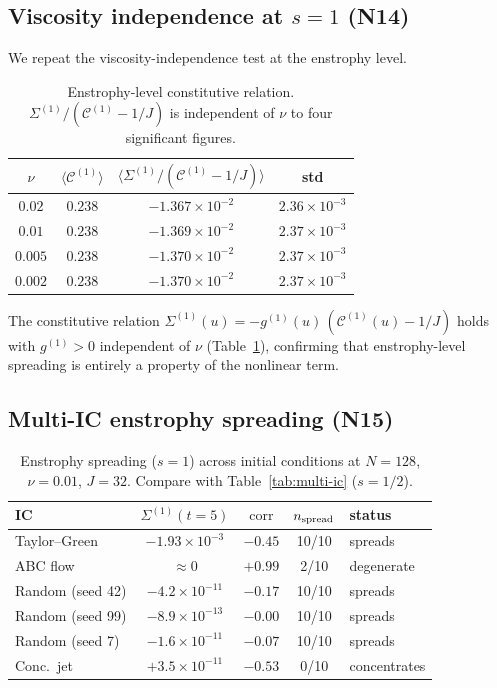 \documentclass[11pt]{article}
\theoremstyle{definition}
\newcommand{\cC}{\mathcal{C}}
\DeclareMathOperator{\corr}{corr}
\begin{document}
\subsection{Viscosity independence at $s=1$ (N14)}
\label{sec:enst-visc}

We repeat the viscosity-independence test at the
enstrophy level.

\begin{table}[h]
\centering
\caption{Enstrophy-level constitutive relation.
$\Sigma^{(1)}/(\cC^{(1)}-1/J)$ is independent of
$\nu$ to four significant figures.}
\label{tab:enst-visc}
\begin{tabular}{@{}cccc@{}}
\toprule
$\nu$ & $\langle\cC^{(1)}\rangle$
  & $\langle\Sigma^{(1)}/(\cC^{(1)}\!-\!1/J)\rangle$
  & std \\
\midrule
$0.02$  & $0.238$ & $-1.367\times 10^{-2}$
  & $2.36\times 10^{-3}$ \\
$0.01$  & $0.238$ & $-1.369\times 10^{-2}$
  & $2.37\times 10^{-3}$ \\
$0.005$ & $0.238$ & $-1.370\times 10^{-2}$
  & $2.37\times 10^{-3}$ \\
$0.002$ & $0.238$ & $-1.370\times 10^{-2}$
  & $2.37\times 10^{-3}$ \\
\bottomrule
\end{tabular}
\end{table}

The constitutive relation
$\Sigma^{(1)}(u) = -g^{(1)}(u)\,(\cC^{(1)}(u)-1/J)$
holds with $g^{(1)}>0$ independent of $\nu$
(Table~\ref{tab:enst-visc}), confirming that
enstrophy-level spreading is entirely a property of
the nonlinear term.


\subsection{Multi-IC enstrophy spreading (N15)}
\label{sec:enst-multi-ic}

\begin{table}[h]
\centering
\caption{Enstrophy spreading ($s=1$) across initial
conditions at $N=128$, $\nu=0.01$, $J=32$.
Compare with Table~\ref{tab:multi-ic} ($s=1/2$).}
\label{tab:enst-multi-ic}
\begin{tabular}{@{}lcccl@{}}
\toprule
IC & $\Sigma^{(1)}(t\!=\!5)$ & $\corr$
  & $n_{\rm spread}$ & status \\
\midrule
Taylor--Green
  & $-1.93\times 10^{-3}$ & $-0.45$ & 10/10
  & spreads \\
ABC flow
  & $\approx 0$ & $+0.99$ & 2/10
  & degenerate \\
Random (seed 42)
  & $-4.2\times 10^{-11}$ & $-0.17$ & 10/10
  & spreads \\
Random (seed 99)
  & $-8.9\times 10^{-13}$ & $-0.00$ & 10/10
  & spreads \\
Random (seed 7)
  & $-1.6\times 10^{-11}$ & $-0.07$ & 10/10
  & spreads \\
Conc.\ jet
  & $+3.5\times 10^{-11}$ & $-0.53$ & 0/10
  & concentrates \\
\bottomrule
\end{tabular}
\end{table}
\end{document}
